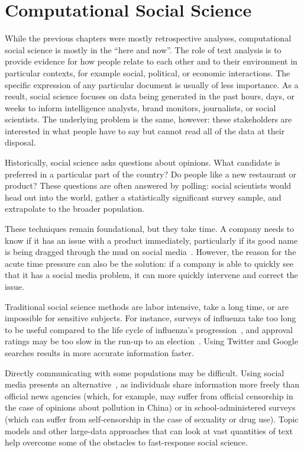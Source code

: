 
\chapter{Computational Social Science}
\label{ch:css}

While the previous chapters were mostly retrospective analyses,
computational social science is mostly in the ``here and now''.  The
role of text analysis is to provide evidence for how people relate to
each other and to their environment in particular contexts, for
example social, political, or economic interactions.  The specific
expression of any particular document is usually of less importance.
As a result, social science focuses on data being generated in the
past hours, days, or weeks to inform intelligence analysts, brand
monitors, journalists, or social scientists.  The underlying problem
is the same, however: these stakeholders are interested in what people
have to say but cannot read all of the data at their disposal.

Historically, social science asks questions about opinions. What candidate is
preferred in a particular part of the country? Do people like a
new restaurant or product?  These questions are often answered by
polling: social scientists would head out into the world, gather a
statistically significant survey sample, and extrapolate to the
broader population.

These techniques remain foundational, but they take time.  A
company needs to know if it has an issue with a product immediately,
particularly if its good name is being dragged through the mud on
social media~\citep{bowen-16}.  However, the reason for the acute time
pressure can also be the solution: if a company is able to quickly see
that it has a social media problem, it can more quickly intervene and
correct the issue.

Traditional social science methods are labor intensive, take a long
time, or are impossible for sensitive subjects.  For instance, surveys
of influenza take too long to be useful compared to the life cycle of
influenza's progression~\citep{broniatowsky-15}, and approval ratings
may be too slow in the run-up to an election~\citep{oconnor-10}.  Using
Twitter and Google searches results in more accurate information
faster.

Directly communicating with some
populations may be difficult.  Using social media presents an
alternative~\citep{wang:paul:dredze-15}, as individuals share
information more freely than official news agencies (which, for example, may suffer
from official censorship in the case of opinions about pollution in China) or in
school-administered surveys (which can suffer from self-censorship in
the case of sexuality or drug use).  Topic models and other large-data approaches
that can look at vast quantities of text help overcome some of the
obstacles to fast-response social science.

